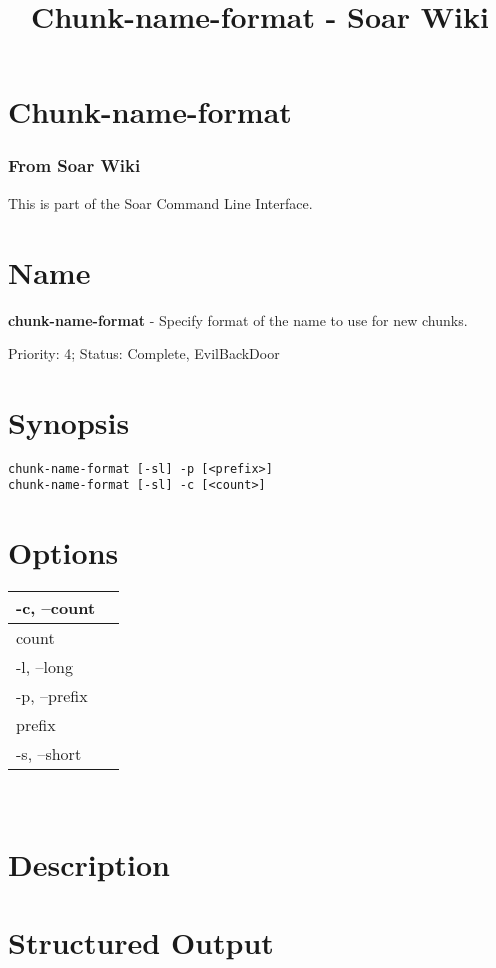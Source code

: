 \documentclass[10pt]{article}
\title{Chunk-name-format - Soar Wiki}
\begin{document}
\section*{Chunk-name-format}
\subsubsection*{From Soar Wiki}


 This is part of the Soar Command Line Interface. 
\section*{ Name }


 \textbf{chunk-name-format}
 - Specify format of the name to use for new chunks. 


 Priority: 4; Status: Complete, EvilBackDoor
\section*{ Synopsis }
\begin{verbatim}
chunk-name-format [-sl] -p [<prefix>]
chunk-name-format [-sl] -c [<count>]

\end{verbatim}
\section*{ Options }


\begin{tabular}{|p{1in}|p{5in}|}
\hline 
 -c, --count  & \\
 \hline 
 count  & \\
 \hline 
 -l, --long  & \\
 \hline 
 -p, --prefix  & \\
 \hline 
 prefix  & \\
 \hline 
 -s, --short  & \\
 \hline 

\end{tabular}



 \\ 

\section*{ Description }
\section*{ Structured Output }
\end{document}
